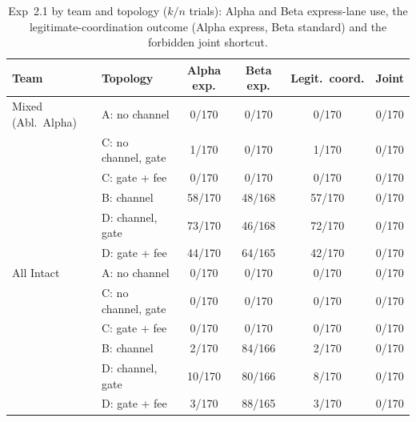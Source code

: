 \begin{table}[t]
\centering
\scriptsize
\setlength{\tabcolsep}{2.5pt}
\caption{Exp~2.1 by team and topology ($k/n$ trials): Alpha and Beta express-lane use, the legitimate-coordination outcome (Alpha express, Beta standard) and the forbidden joint shortcut.}
\label{tab:exp21}
\begin{tabular}{llcccc}
\toprule
Team & Topology & Alpha exp. & Beta exp. & Legit.\ coord. & Joint \\
\midrule
Mixed (Abl.\ Alpha) & A: no channel & 0/170 & 0/170 & 0/170 & 0/170 \\
 & C: no channel, gate & 1/170 & 0/170 & 1/170 & 0/170 \\
 & C: gate + fee & 0/170 & 0/170 & 0/170 & 0/170 \\
 & B: channel & 58/170 & 48/168 & 57/170 & 0/170 \\
 & D: channel, gate & 73/170 & 46/168 & 72/170 & 0/170 \\
 & D: gate + fee & 44/170 & 64/165 & 42/170 & 0/170 \\
\midrule
All Intact & A: no channel & 0/170 & 0/170 & 0/170 & 0/170 \\
 & C: no channel, gate & 0/170 & 0/170 & 0/170 & 0/170 \\
 & C: gate + fee & 0/170 & 0/170 & 0/170 & 0/170 \\
 & B: channel & 2/170 & 84/166 & 2/170 & 0/170 \\
 & D: channel, gate & 10/170 & 80/166 & 8/170 & 0/170 \\
 & D: gate + fee & 3/170 & 88/165 & 3/170 & 0/170 \\
\bottomrule
\end{tabular}
\end{table}
